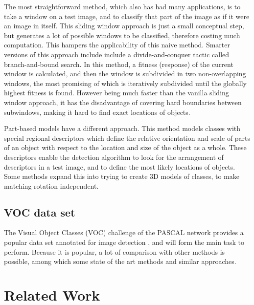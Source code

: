 \documentclass[a4paper,10pt]{article}
\begin{document}
The most straightforward method, which also has had many applications, is to take a window on a test image, and to classify that part of the image as if it were an image in itself. This sliding window approach  is just a small conceptual step, but generates a lot of possible windows to be classified, therefore costing much computation. This hampers the applicability of this naive method. Smarter versions of this approach include include a divide-and-conquer tactic called branch-and-bound search. \cite{lampert2008beyond} In this method, a fitness (response) of the current window is calculated, and then the window is subdivided in two non-overlapping windows, the most promising of which is iteratively subdivided until the globally highest fitness is found. However being much faster than the vanilla sliding window approach, it has the disadvantage of covering hard boundaries between subwindows, making it hard to find exact locations of objects.

Part-based models have a different approach. This method models classes with special regional descriptors which define the relative orientation and scale of parts of an object with respect to the location and size of the object as a whole. \cite{leibe2004combined, chum2007exemplar, felzenszwalb2010object} These descriptors enable the detection algorithm to look for the arrangement of descriptors in a test image, and to define the most likely locations of objects. Some methods expand this into trying to create 3D models of classes, to make matching rotation independent. 

\subsection{VOC data set} %
\label{sub:voc_data_set}
The Visual Object Classes (VOC) challenge of the PASCAL network  provides a popular data set annotated for image detection , and will form the main task to perform. Because it is popular, a lot of comparison with other methods is possible, among which some state of the art methods and similar approaches.



\section{Related Work} %
\label{sec:related_work}
\end{document}
